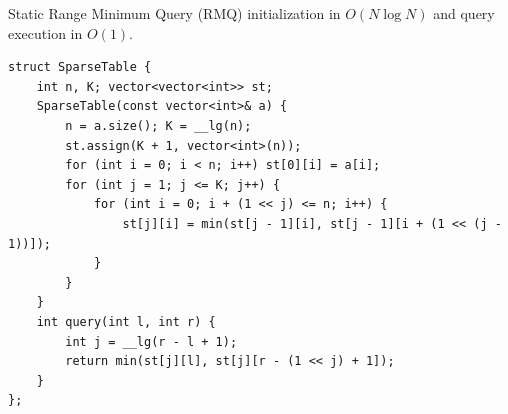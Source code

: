 
Static Range Minimum Query (RMQ) initialization in $O(N \log N)$ and query execution in $O(1)$.
\begin{lstlisting}
struct SparseTable {
    int n, K; vector<vector<int>> st;
    SparseTable(const vector<int>& a) {
        n = a.size(); K = __lg(n);
        st.assign(K + 1, vector<int>(n));
        for (int i = 0; i < n; i++) st[0][i] = a[i];
        for (int j = 1; j <= K; j++) {
            for (int i = 0; i + (1 << j) <= n; i++) {
                st[j][i] = min(st[j - 1][i], st[j - 1][i + (1 << (j - 1))]);
            }
        }
    }
    int query(int l, int r) {
        int j = __lg(r - l + 1);
        return min(st[j][l], st[j][r - (1 << j) + 1]);
    }
};
\end{lstlisting}
